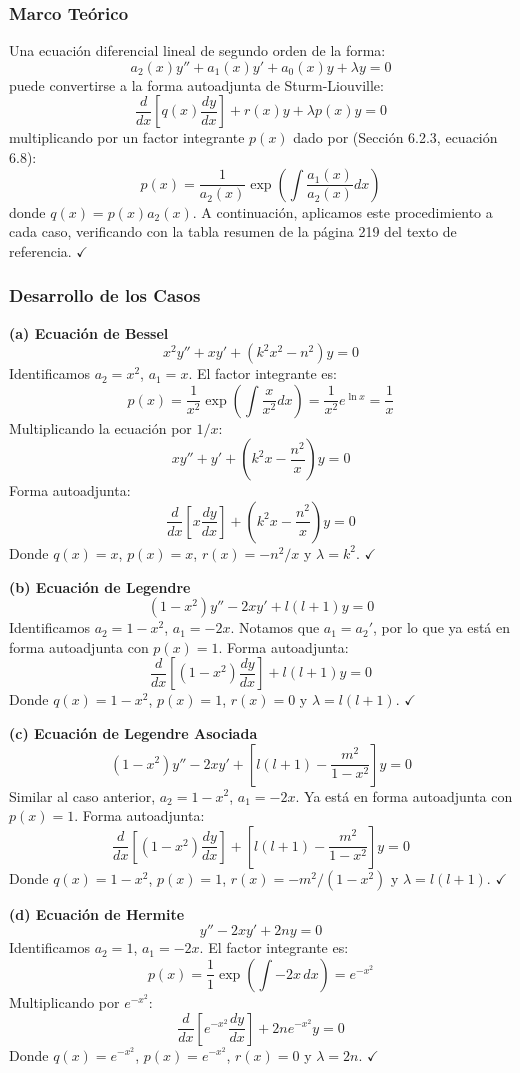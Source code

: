 \documentclass[a4paper]{article}
\begin{document}
\subsubsection{Marco Teórico}

Una ecuación diferencial lineal de segundo orden de la forma:
$$
a_2(x)y'' + a_1(x)y' + a_0(x)y + \lambda y = 0
$$
puede convertirse a la forma autoadjunta de Sturm-Liouville:
$$
\frac{d}{dx}\left[ q(x) \frac{dy}{dx} \right] + r(x)y + \lambda p(x)y = 0
$$
multiplicando por un factor integrante $p(x)$ dado por (Sección 6.2.3, ecuación 6.8):
$$
p(x) = \frac{1}{a_2(x)} \exp\left( \int \frac{a_1(x)}{a_2(x)} dx \right)
$$
donde $q(x) = p(x)a_2(x)$. A continuación, aplicamos este procedimiento a cada caso, verificando con la tabla resumen de la página 219 del texto de referencia. $\checkmark$

\subsubsection{Desarrollo de los Casos}

\textbf{(a) Ecuación de Bessel}
$$ x^2 y'' + xy' + (k^2 x^2 - n^2)y = 0 $$
Identificamos $a_2 = x^2$, $a_1 = x$. El factor integrante es:
$$ p(x) = \frac{1}{x^2} \exp\left( \int \frac{x}{x^2} dx \right) = \frac{1}{x^2} e^{\ln x} = \frac{1}{x} $$
Multiplicando la ecuación por $1/x$:
$$ x y'' + y' + \left( k^2 x - \frac{n^2}{x} \right)y = 0 $$
Forma autoadjunta:
$$ \boxed{\frac{d}{dx}\left[ x \frac{dy}{dx} \right] + \left( k^2 x - \frac{n^2}{x} \right)y = 0} $$
Donde $q(x)=x$, $p(x)=x$, $r(x)=-n^2/x$ y $\lambda = k^2$. $\checkmark$

\textbf{(b) Ecuación de Legendre}
$$ (1 - x^2)y'' - 2xy' + l(l+1)y = 0 $$
Identificamos $a_2 = 1 - x^2$, $a_1 = -2x$. Notamos que $a_1 = a_2'$, por lo que ya está en forma autoadjunta con $p(x)=1$.
Forma autoadjunta:
$$ \boxed{\frac{d}{dx}\left[ (1 - x^2) \frac{dy}{dx} \right] + l(l+1)y = 0} $$
Donde $q(x)=1-x^2$, $p(x)=1$, $r(x)=0$ y $\lambda = l(l+1)$. $\checkmark$

\textbf{(c) Ecuación de Legendre Asociada}
$$ (1 - x^2)y'' - 2xy' + \left[ l(l+1) - \frac{m^2}{1-x^2} \right]y = 0 $$
Similar al caso anterior, $a_2 = 1 - x^2$, $a_1 = -2x$. Ya está en forma autoadjunta con $p(x)=1$.
Forma autoadjunta:
$$ \boxed{\frac{d}{dx}\left[ (1 - x^2) \frac{dy}{dx} \right] + \left[ l(l+1) - \frac{m^2}{1-x^2} \right]y = 0} $$
Donde $q(x)=1-x^2$, $p(x)=1$, $r(x)=-m^2/(1-x^2)$ y $\lambda = l(l+1)$. $\checkmark$

\textbf{(d) Ecuación de Hermite}
$$ y'' - 2xy' + 2ny = 0 $$
Identificamos $a_2 = 1$, $a_1 = -2x$. El factor integrante es:
$$ p(x) = \frac{1}{1} \exp\left( \int -2x \, dx \right) = e^{-x^2} $$
Multiplicando por $e^{-x^2}$:
$$ \boxed{\frac{d}{dx}\left[ e^{-x^2} \frac{dy}{dx} \right] + 2n e^{-x^2} y = 0} $$
Donde $q(x)=e^{-x^2}$, $p(x)=e^{-x^2}$, $r(x)=0$ y $\lambda = 2n$. $\checkmark$
\end{document}
